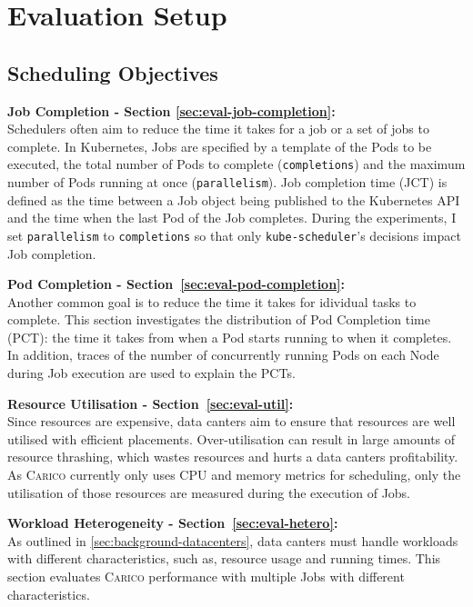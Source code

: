 \chapter{Evaluation Setup}

\section{Scheduling Objectives}
\label{app:setup-objectives}
\textbf{Job Completion - Section \ref{sec:eval-job-completion}:}\\
Schedulers often aim to reduce the time it takes for a job or a set of jobs to
complete. In Kubernetes, Jobs are specified by a template of the Pods to be
executed, the total number of Pods to complete (\texttt{completions}) and the
maximum number of Pods running at once (\texttt{parallelism}). Job completion
time (JCT) is defined as the time between a Job object being published to the
Kubernetes API and the time when the last Pod of the Job completes. During the
experiments, I set \texttt{parallelism} to \texttt{completions} so that only
\texttt{kube-scheduler}'s decisions impact Job completion.

\textbf{Pod Completion - Section~\ref{sec:eval-pod-completion}:}\\
Another common goal is to reduce the time it takes for idividual tasks to complete.
This section investigates the distribution of Pod Completion time (PCT): the
time it takes from when a Pod starts running to when it completes. In addition,
traces of the number of concurrently running Pods on each Node during Job
execution are used to explain the PCTs.

\textbf{Resource Utilisation - Section~\ref{sec:eval-util}:}\\
Since resources are expensive, data canters aim to ensure that resources are
well utilised with efficient placements. Over-utilisation can result in large
amounts of resource thrashing, which wastes resources and hurts a data canters
profitability. As \textsc{Carico} currently only uses CPU and memory metrics
for scheduling, only the utilisation of those resources are measured during the
execution of Jobs.

\textbf{Workload Heterogeneity - Section~\ref{sec:eval-hetero}:}\\
As outlined in \ref{sec:background-datacenters}, data canters must handle
workloads with different characteristics, such as, resource usage and running
times. This section evaluates \textsc{Carico} performance with multiple Jobs
with different characteristics.

